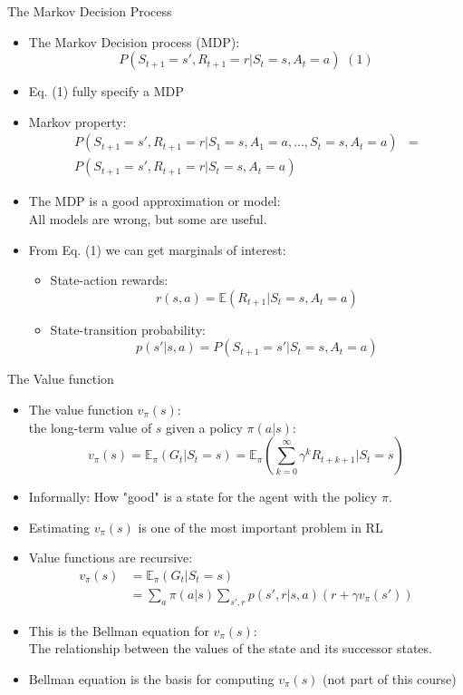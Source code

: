 \documentclass[10pt]{beamer}
\begin{document}
\begin{frame}{The Markov Decision Process}

\begin{itemize}
\item The Markov Decision process (MDP):
\[
P(S_{t+1} = s', R_{t+1} = r| S_t = s, A_t = a)\,\,(1)
\]
\item Eq. (1) {\color{uured}fully specify} a MDP
\pause
\item Markov property:
\begin{align*}
       P(S_{t+1} = s', R_{t+1} = r| S_1 = s, A_1 = a , ..., S_t = s, A_t = a) &  = \\
       P(S_{t+1} = s', R_{t+1} = r| S_t = s, A_t = a) &
\end{align*}
\pause
\item The MDP is a good {\color{uured} approximation or model}:\\
      All models are wrong, but some are useful.\pause
\item From Eq. (1) we can get marginals of interest:
\begin{itemize}
\item State-action rewards:
\[
r(s,a) = \mathbb{E}(R_{t+1}|S_t=s, A_t=a)
\]\pause
\item State-transition probability:
\[
p(s'|s,a) = P(S_{t+1}=s'|S_t=s, A_t=a)
\]
\end{itemize}
\end{itemize}

\end{frame}


\begin{frame}{The Value function}

\begin{itemize}
\item The value function $v_{\pi}(s)$: \\the long-term value of $s$ given a policy $\pi(a|s)$:
\[
v_{\pi}(s) = \mathbb{E}_\pi(G_t|S_t = s) = \mathbb{E}_\pi\left(\sum^\infty_{k=0} \gamma^k R_{t+k+1} | S_t=s \right)
\]
\pause
\item Informally: How "good" is a state for the agent with the policy $\pi$.\pause
\item Estimating $v_{\pi}(s)$ is one of the most important problem in RL\pause
\item Value functions are {\color{uured}recursive}:
\begin{align*}
       v_{\pi}(s) & = \mathbb{E}_\pi(G_t|S_t = s)      \\
                  & = \sum_a \pi(a|s) \sum_{s',r} p(s', r|s,a) (r + \gamma v_{\pi}(s'))
\end{align*}
\item This is the {\color{uured}Bellman equation} for $v_\pi(s)$: \\The relationship between the values of the state and its successor states.\pause
\item Bellman equation is the basis for computing $v_\pi(s)$ (not part of this course)

\end{itemize}

\end{frame}
\end{document}
